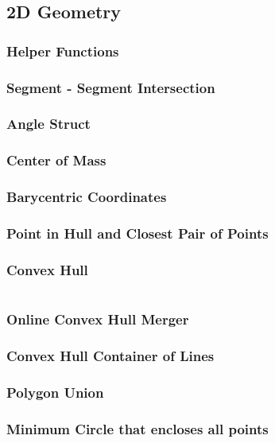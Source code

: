 \subsection{2D Geometry}
\subsubsection{Helper Functions}
\subsubsection{Segment - Segment Intersection}
\subsubsection{Angle Struct}
\subsubsection{Center of Mass}
\subsubsection{Barycentric Coordinates}
\subsubsection{Point in Hull and Closest Pair of Points}
\subsubsection{Convex Hull}

\hrulefill
\begin{multicols}{2}
\inputminted[autogobble,fontsize=\footnotesize]{C++}{Geometry/graham_scan.cpp}
\end{multicols}
\hrulefill

\subsubsection{Online Convex Hull Merger}
\subsubsection{Convex Hull Container of Lines}
\subsubsection{Polygon Union}
\subsubsection{Minimum Circle that encloses all points}
